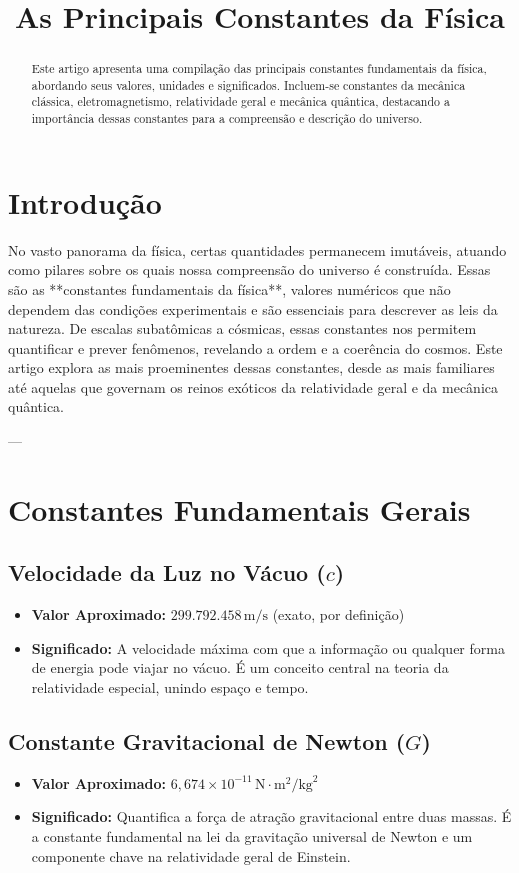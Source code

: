 \documentclass{article}
\title{As Principais Constantes da Física}
\author{} %
\date{} %
\begin{document}
\maketitle

\begin{abstract}
Este artigo apresenta uma compilação das principais constantes fundamentais da física, abordando seus valores, unidades e significados. Incluem-se constantes da mecânica clássica, eletromagnetismo, relatividade geral e mecânica quântica, destacando a importância dessas constantes para a compreensão e descrição do universo.
\end{abstract}

\section{Introdução}
No vasto panorama da física, certas quantidades permanecem imutáveis, atuando como pilares sobre os quais nossa compreensão do universo é construída. Essas são as **constantes fundamentais da física**, valores numéricos que não dependem das condições experimentais e são essenciais para descrever as leis da natureza. De escalas subatômicas a cósmicas, essas constantes nos permitem quantificar e prever fenômenos, revelando a ordem e a coerência do cosmos. Este artigo explora as mais proeminentes dessas constantes, desde as mais familiares até aquelas que governam os reinos exóticos da relatividade geral e da mecânica quântica.

---

\section{Constantes Fundamentais Gerais}

\subsection{Velocidade da Luz no Vácuo ($c$)}
\begin{itemize}
    \item \textbf{Valor Aproximado:} $299.792.458 \, \text{m/s}$ (exato, por definição)
    \item \textbf{Significado:} A velocidade máxima com que a informação ou qualquer forma de energia pode viajar no vácuo. É um conceito central na teoria da relatividade especial, unindo espaço e tempo.
\end{itemize}

\subsection{Constante Gravitacional de Newton ($G$)}
\begin{itemize}
    \item \textbf{Valor Aproximado:} $6,674 \times 10^{-11} \, \text{N} \cdot \text{m}^2/\text{kg}^2$
    \item \textbf{Significado:} Quantifica a força de atração gravitacional entre duas massas. É a constante fundamental na lei da gravitação universal de Newton e um componente chave na relatividade geral de Einstein.
\end{itemize}
\end{document}
